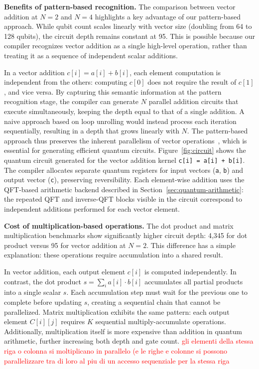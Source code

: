 \textbf{Benefits of pattern-based recognition.} The comparison between vector addition at $N=2$ and $N=4$ highlights a key advantage of our pattern-based approach. While qubit count scales linearly with vector size (doubling from 64 to 128 qubits), the circuit depth remains constant at 95. This is possible because our compiler recognizes vector addition as a single high-level operation, rather than treating it as a sequence of independent scalar additions.

In a vector addition $c[i] = a[i] + b[i]$, each element computation is independent from the others: computing $c[0]$ does not require the result of $c[1]$, and vice versa. By capturing this semantic information at the pattern recognition stage, the compiler can generate $N$ parallel addition circuits that execute simultaneously, keeping the depth equal to that of a single addition.
A naive approach based on loop unrolling would instead process each iteration sequentially, resulting in a depth that grows linearly with $N$. The pattern-based approach thus preserves the inherent parallelism of vector operations~\cite{hls-book}, which is essential for generating efficient quantum circuits. Figure~\ref{fig:circuit} shows the quantum circuit generated for the vector addition kernel \texttt{c[i] = a[i] + b[i]}. The compiler allocates separate quantum registers for input vectors (\texttt{a}, \texttt{b}) and output vector (\texttt{c}), preserving reversibility. Each element-wise addition uses the QFT-based arithmetic backend described in Section~\ref{sec:quantum-arithmetic}: the repeated QFT and inverse-QFT blocks visible in the circuit correspond to independent additions performed for each vector element.

\textbf{Cost of multiplication-based operations.} The dot product and matrix multiplication benchmarks show significantly higher circuit depth: 4,345 for dot product versus 95 for vector addition at $N=2$. This difference has a simple explanation: these operations require accumulation into a shared result.

In vector addition, each output element $c[i]$ is computed independently. In contrast, the dot product $s = \sum_{i} a[i] \cdot b[i]$ accumulates all partial products into a single scalar $s$. Each accumulation step must wait for the previous one to complete before updating $s$, creating a sequential chain that cannot be parallelized. Matrix multiplication exhibits the same pattern: each output element $C[i][j]$ requires $K$ sequential multiply-accumulate operations. Additionally, multiplication itself is more expensive than addition in quantum arithmetic, further increasing both depth and gate count.
\textcolor{red}{gli elementi della stessa riga o colonna si moltiplicano in parallelo (e le righe e colonne si possono parallelizzare tra di loro al piu di un accesso sequenziale per la stessa riga}


